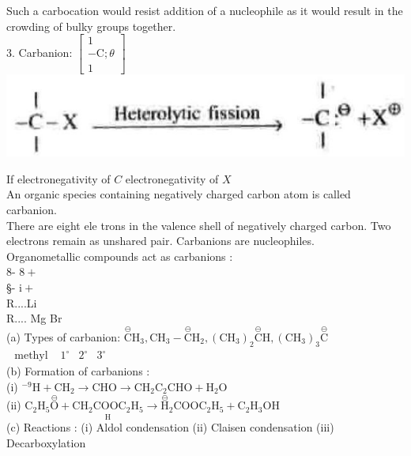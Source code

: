 \documentclass[10pt]{article}
\begin{document}
Such a carbocation would resist addition of a nucleophile as it would result in the crowding of bulky groups together.\\
3. Carbanion: $\left[\begin{array}{c}1 \\ -\mathrm{C} ; \theta \\ 1\end{array}\right]$\\
\includegraphics[max width=\textwidth, center]{2025_01_28_8470952b98110cec3aabg-087(2)}

If electronegativity of $C$ electronegativity of $X$\\
An organic species containing negatively charged carbon atom is called carbanion.\\
There are eight ele trons in the valence shell of negatively charged carbon. Two electrons remain as unshared pair. Carbanions are nucleophiles.\\
Organometallic compounds act as carbanions :\\
8- $8+$\\
§- $\mathrm{i}+$\\
R....Li\\
R.... Mg Br\\
(a) Types of carbanion: $\stackrel{\ominus}{\mathrm{C}} \mathrm{H}_{3}, \mathrm{CH}_{3}-\stackrel{\ominus}{\mathrm{C}} \mathrm{H}_{2},\left(\mathrm{CH}_{3}\right)_{2} \stackrel{\ominus}{\mathrm{C}} \mathrm{H},\left(\mathrm{CH}_{3}\right)_{3} \stackrel{\ominus}{\mathrm{C}}$ $\begin{array}{cccc}\text { methyl } & 1^{\circ} & 2^{\circ} & 3^{\circ}\end{array}$\\
(b) Formation of carbanions :\\
(i) ${ }^{-9} \mathrm{H}+\mathrm{CH}_{2} \rightarrow \mathrm{CHO} \longrightarrow \mathrm{CH}_{2} \mathrm{C}_{2} \mathrm{CHO}+\mathrm{H}_{2} \mathrm{O}$\\
(ii) $\mathrm{C}_{2} \mathrm{H}_{5} \stackrel{\ominus}{\mathrm{O}}+\underset{\mathrm{H}}{\mathrm{CH}_{2} \mathrm{COOC}_{2} \mathrm{H}_{5}} \longrightarrow \stackrel{\ominus}{\mathrm{H}}_{2} \mathrm{COOC}_{2} \mathrm{H}_{5}+\mathrm{C}_{2} \mathrm{H}_{3} \mathrm{OH}$\\
(c) Reactions : (i) Aldol condensation (ii) Claisen condensation (iii) Decarboxylation
\end{document}
